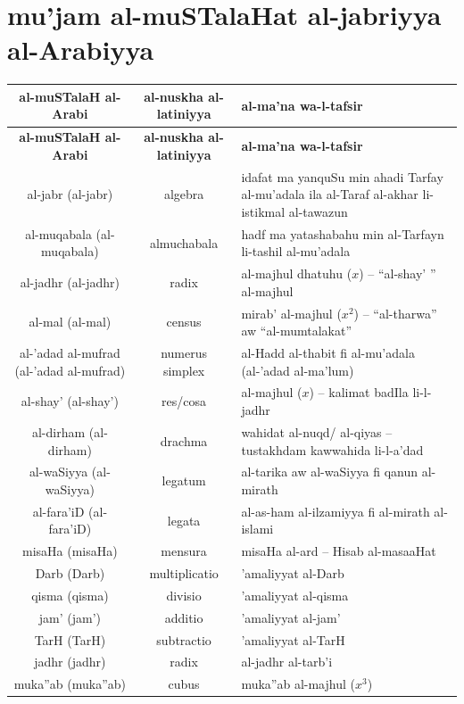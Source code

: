 \documentclass[11pt,a4paper]{book}
\begin{document}
\newpage

\chapter{mu'jam al-muSTalaHat al-jabriyya al-Arabiyya}
\label{app:glossary}

\begin{center}
\renewcommand{\arraystretch}{1.6}
\begin{longtable}{|c|c|p{6cm}|}
\hline
\textbf{al-muSTalaH al-Arabi} & \textbf{al-nuskha al-latiniyya} & \textbf{al-ma'na wa-l-tafsir} \\
\hline
\endfirsthead
\hline
\textbf{al-muSTalaH al-Arabi} & \textbf{al-nuskha al-latiniyya} & \textbf{al-ma'na wa-l-tafsir} \\
\hline
\endhead
\hline
\endfoot
al-jabr (al-jabr) & algebra & idafat ma yanquSu min ahadi Tarfay al-mu'adala ila al-Taraf al-akhar li-istikmal al-tawazun \\
\hline
al-muqabala (al-muqabala) & almuchabala & hadf ma yatashabahu min al-Tarfayn li-tashil al-mu'adala \\
\hline
al-jadhr (al-jadhr) & radix & al-majhul dhatuhu ($x$) -- ``al-shay' '' al-majhul \\
\hline
al-mal (al-mal) & census & mirab' al-majhul ($x^2$) -- ``al-tharwa'' aw ``al-mumtalakat'' \\
\hline
al-'adad al-mufrad (al-'adad al-mufrad) & numerus simplex & al-Hadd al-thabit fi al-mu'adala (al-'adad al-ma'lum) \\
\hline
al-shay' (al-shay') & res/cosa & al-majhul ($x$) -- kalimat badIla li-l-jadhr \\
\hline
al-dirham (al-dirham) & drachma & wahidat al-nuqd/ al-qiyas -- tustakhdam kawwahida li-l-a'dad \\
\hline
al-waSiyya (al-waSiyya) & legatum & al-tarika aw al-waSiyya fi qanun al-mirath \\
\hline
al-fara'iD (al-fara'iD) & legata & al-as-ham al-ilzamiyya fi al-mirath al-islami \\
\hline
misaHa (misaHa) & mensura & misaHa al-ard -- Hisab al-masaaHat \\
\hline
Darb (Darb) & multiplicatio & 'amaliyyat al-Darb \\
\hline
qisma (qisma) & divisio & 'amaliyyat al-qisma \\
\hline
jam' (jam') & additio & 'amaliyyat al-jam' \\
\hline
TarH (TarH) & subtractio & 'amaliyyat al-TarH \\
\hline
jadhr (jadhr) & radix & al-jadhr al-tarb'i \\
\hline
muka''ab (muka''ab) & cubus & muka''ab al-majhul ($x^3$) \\
\hline
\end{longtable}
\end{center}
\end{document}
